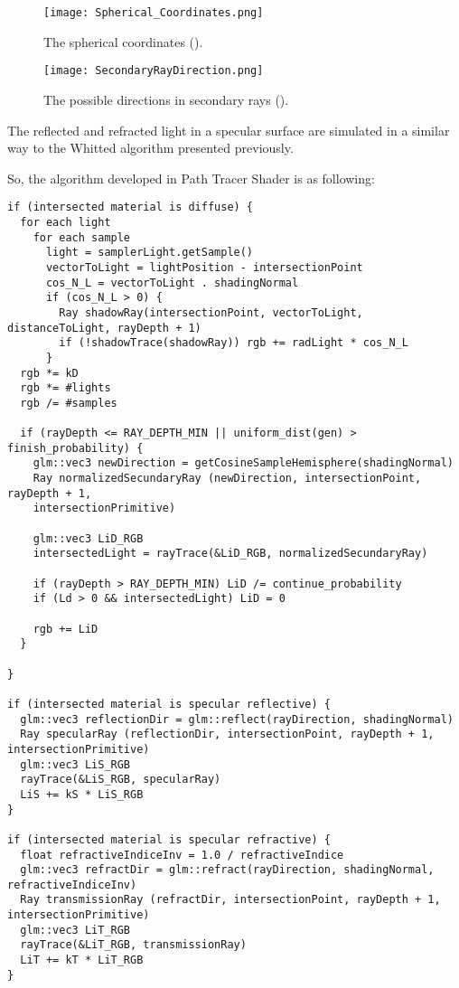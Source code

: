\begin{figure}[H]
	\centering
	\caption{The spherical coordinates (\cite{SphericalCoordinates}).}
	\label{Spherical_Coordinates.}
	\texttt{[image: Spherical\_Coordinates.png]}
\end{figure}

\begin{figure}[H]
	\centering
	\caption{The possible directions in secondary rays (\cite{SamplingRayDirection}).}
	\label{Secondary_Rays.}
	\texttt{[image: SecondaryRayDirection.png]}
\end{figure}

\par
The reflected and refracted light in a specular surface are simulated in a similar way to the Whitted algorithm presented previously.

\par
So, the algorithm developed in Path Tracer Shader is as following:

\begin{lstlisting}[caption={Algorithm of Path Tracer Shader}, captionpos=b, label=PathTracer]
if (intersected material is diffuse) {
  for each light
    for each sample
      light = samplerLight.getSample()
      vectorToLight = lightPosition - intersectionPoint
      cos_N_L = vectorToLight . shadingNormal
      if (cos_N_L > 0) {
        Ray shadowRay(intersectionPoint, vectorToLight, distanceToLight, rayDepth + 1)
        if (!shadowTrace(shadowRay)) rgb += radLight * cos_N_L
      }
  rgb *= kD
  rgb *= #lights
  rgb /= #samples

  if (rayDepth <= RAY_DEPTH_MIN || uniform_dist(gen) > finish_probability) {
    glm::vec3 newDirection = getCosineSampleHemisphere(shadingNormal)
    Ray normalizedSecundaryRay (newDirection, intersectionPoint, rayDepth + 1,
    intersectionPrimitive)
    
    glm::vec3 LiD_RGB
    intersectedLight = rayTrace(&LiD_RGB, normalizedSecundaryRay)

    if (rayDepth > RAY_DEPTH_MIN) LiD /= continue_probability
    if (Ld > 0 && intersectedLight) LiD = 0

    rgb += LiD
  }

}

if (intersected material is specular reflective) {
  glm::vec3 reflectionDir = glm::reflect(rayDirection, shadingNormal)
  Ray specularRay (reflectionDir, intersectionPoint, rayDepth + 1, intersectionPrimitive)
  glm::vec3 LiS_RGB
  rayTrace(&LiS_RGB, specularRay)
  LiS += kS * LiS_RGB
}

if (intersected material is specular refractive) {
  float refractiveIndiceInv = 1.0 / refractiveIndice
  glm::vec3 refractDir = glm::refract(rayDirection, shadingNormal, refractiveIndiceInv)
  Ray transmissionRay (refractDir, intersectionPoint, rayDepth + 1, intersectionPrimitive)
  glm::vec3 LiT_RGB
  rayTrace(&LiT_RGB, transmissionRay)
  LiT += kT * LiT_RGB
}
\end{lstlisting}

